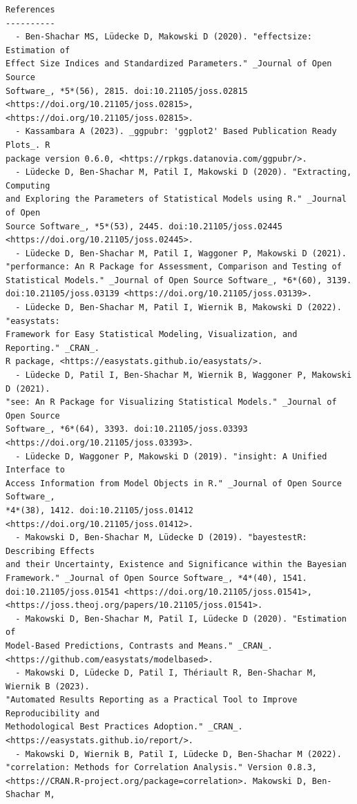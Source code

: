 \documentclass[
  10pt]{article}
\begin{document}
\begin{tcolorbox}[enhanced jigsaw, colframe=quarto-callout-color-frame, arc=.35mm, rightrule=.15mm, colback=white, bottomrule=.15mm, toprule=.15mm, leftrule=.75mm, left=2mm, breakable, opacityback=0]
\begin{verbatim}
References
----------
  - Ben-Shachar MS, Lüdecke D, Makowski D (2020). "effectsize: Estimation of
Effect Size Indices and Standardized Parameters." _Journal of Open Source
Software_, *5*(56), 2815. doi:10.21105/joss.02815
<https://doi.org/10.21105/joss.02815>, <https://doi.org/10.21105/joss.02815>.
  - Kassambara A (2023). _ggpubr: 'ggplot2' Based Publication Ready Plots_. R
package version 0.6.0, <https://rpkgs.datanovia.com/ggpubr/>.
  - Lüdecke D, Ben-Shachar M, Patil I, Makowski D (2020). "Extracting, Computing
and Exploring the Parameters of Statistical Models using R." _Journal of Open
Source Software_, *5*(53), 2445. doi:10.21105/joss.02445
<https://doi.org/10.21105/joss.02445>.
  - Lüdecke D, Ben-Shachar M, Patil I, Waggoner P, Makowski D (2021).
"performance: An R Package for Assessment, Comparison and Testing of
Statistical Models." _Journal of Open Source Software_, *6*(60), 3139.
doi:10.21105/joss.03139 <https://doi.org/10.21105/joss.03139>.
  - Lüdecke D, Ben-Shachar M, Patil I, Wiernik B, Makowski D (2022). "easystats:
Framework for Easy Statistical Modeling, Visualization, and Reporting." _CRAN_.
R package, <https://easystats.github.io/easystats/>.
  - Lüdecke D, Patil I, Ben-Shachar M, Wiernik B, Waggoner P, Makowski D (2021).
"see: An R Package for Visualizing Statistical Models." _Journal of Open Source
Software_, *6*(64), 3393. doi:10.21105/joss.03393
<https://doi.org/10.21105/joss.03393>.
  - Lüdecke D, Waggoner P, Makowski D (2019). "insight: A Unified Interface to
Access Information from Model Objects in R." _Journal of Open Source Software_,
*4*(38), 1412. doi:10.21105/joss.01412 <https://doi.org/10.21105/joss.01412>.
  - Makowski D, Ben-Shachar M, Lüdecke D (2019). "bayestestR: Describing Effects
and their Uncertainty, Existence and Significance within the Bayesian
Framework." _Journal of Open Source Software_, *4*(40), 1541.
doi:10.21105/joss.01541 <https://doi.org/10.21105/joss.01541>,
<https://joss.theoj.org/papers/10.21105/joss.01541>.
  - Makowski D, Ben-Shachar M, Patil I, Lüdecke D (2020). "Estimation of
Model-Based Predictions, Contrasts and Means." _CRAN_.
<https://github.com/easystats/modelbased>.
  - Makowski D, Lüdecke D, Patil I, Thériault R, Ben-Shachar M, Wiernik B (2023).
"Automated Results Reporting as a Practical Tool to Improve Reproducibility and
Methodological Best Practices Adoption." _CRAN_.
<https://easystats.github.io/report/>.
  - Makowski D, Wiernik B, Patil I, Lüdecke D, Ben-Shachar M (2022).
"correlation: Methods for Correlation Analysis." Version 0.8.3,
<https://CRAN.R-project.org/package=correlation>. Makowski D, Ben-Shachar M,

\end{verbatim}
\end{tcolorbox}
\end{document}

